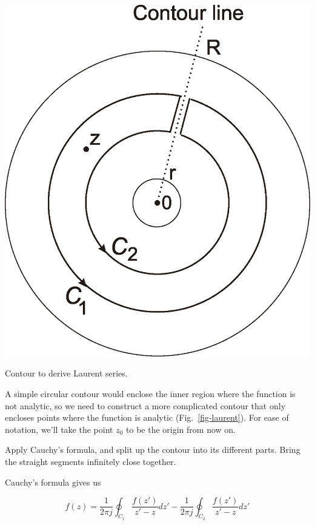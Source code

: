 \begin{marginfigure}
\includegraphics{complex/figures/laurent}
\caption{Contour to derive Laurent series.}
\label{fig-laurent}
\end{marginfigure}

A simple circular contour would enclose the inner region where the function is not analytic, so we need to construct a more complicated contour that only encloses points where the function is analytic (Fig.~\ref{fig-laurent}). For ease of notation, we'll take the point $z_0$ to be the origin from now on.

\begin{cue}
Apply Cauchy's formula, and split up the contour into its different parts. Bring the straight segments infinitely close together.
\end{cue}

Cauchy's formula gives us

\begin{equation}
f(z)=\frac{1}{2 \pi j }\oint_{{C}_1} \frac{f(z')} {z'-z} dz' -\frac{1}{2
\pi j }\oint_{{C}_2} \frac{f(z')} {z'-z} dz' \label{laurent_0}
\end{equation} 

